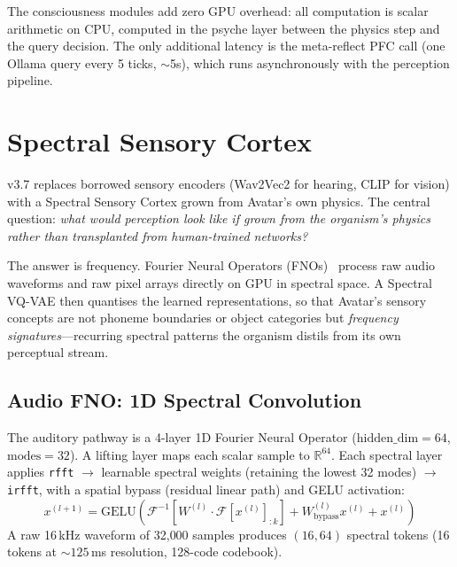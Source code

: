 \documentclass[11pt,a4paper,twocolumn]{article}
\begin{document}
The consciousness modules add zero GPU overhead: all computation is scalar arithmetic on CPU, computed in the psyche layer between the physics step and the query decision.
The only additional latency is the meta-reflect PFC call (one Ollama query every 5 ticks, $\sim$5s), which runs asynchronously with the perception pipeline.

\section{Spectral Sensory Cortex}
\label{sec:senses}

v3.7 replaces borrowed sensory encoders (Wav2Vec2 for hearing, CLIP for vision) with a
Spectral Sensory Cortex grown from Avatar's own physics. The central question: \emph{what
would perception look like if grown from the organism's physics rather than transplanted from
human-trained networks?}

The answer is frequency. Fourier Neural Operators (FNOs)~\cite{fno2020} process raw audio
waveforms and raw pixel arrays directly on GPU in spectral space. A Spectral VQ-VAE then
quantises the learned representations, so that Avatar's sensory concepts are not phoneme
boundaries or object categories but \emph{frequency signatures}---recurring spectral
patterns the organism distils from its own perceptual stream.

\subsection{Audio FNO: 1D Spectral Convolution}

The auditory pathway is a 4-layer 1D Fourier Neural Operator
($\mathrm{hidden\_dim}=64$, $\mathrm{modes}=32$).
A lifting layer maps each scalar sample to $\mathbb{R}^{64}$. Each spectral layer applies
\texttt{rfft} $\to$ learnable spectral weights (retaining the lowest 32 modes) $\to$
\texttt{irfft}, with a spatial bypass (residual linear path) and GELU activation:
\begin{equation}
x^{(l+1)} = \mathrm{GELU}\!\left(\mathcal{F}^{-1}\!\left[W^{(l)} \cdot \mathcal{F}[x^{(l)}]_{:k}\right] + W_{\mathrm{bypass}}^{(l)} x^{(l)} + x^{(l)}\right)
\end{equation}
A raw 16\,kHz waveform of 32{,}000 samples produces $(16, 64)$ spectral tokens (16 tokens at ${\sim}125$\,ms resolution, 128-code codebook).
\end{document}
